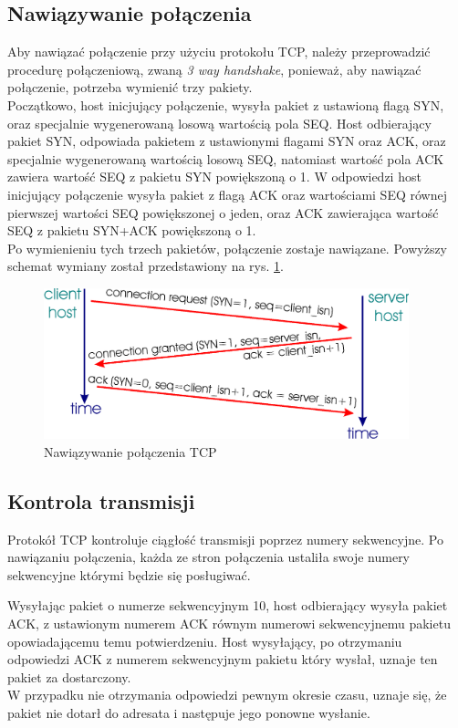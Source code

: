 \documentclass[a4paper,12pt,oneside]{book}
\begin{document}
		\subsection{Nawiązywanie połączenia}
			Aby nawiązać połączenie przy użyciu protokołu TCP, należy przeprowadzić procedurę połączeniową, zwaną \textit{3 way handshake}, ponieważ, aby nawiązać połączenie, potrzeba wymienić trzy pakiety.\\
			Początkowo, host inicjujący połączenie, wysyła pakiet z ustawioną flagą SYN, oraz specjalnie wygenerowaną losową wartością pola SEQ. Host odbierający pakiet SYN, odpowiada pakietem z ustawionymi flagami SYN oraz ACK, oraz specjalnie wygenerowaną wartością losową SEQ, natomiast wartość pola ACK zawiera wartość SEQ z pakietu SYN powiększoną o 1.
			W odpowiedzi host inicjujący połączenie wysyła pakiet z flagą ACK oraz wartościami SEQ równej pierwszej wartości SEQ powiększonej o jeden, oraz ACK zawierająca wartość SEQ z pakietu SYN+ACK powiększoną o 1.\\
			Po wymienieniu tych trzech pakietów, połączenie zostaje nawiązane.
			Powyższy schemat wymiany został przedstawiony na rys. \ref{fig:tcp_syn}.
			\begin{figure}[h]
				\centering
					\includegraphics[width=400px]{tcp_3way.png}
					\caption{Nawiązywanie połączenia TCP}
					\label{fig:tcp_syn}
			\end{figure}
		\subsection{Kontrola transmisji}
			Protokół TCP kontroluje ciągłość transmisji poprzez numery sekwencyjne.
			Po nawiązaniu połączenia, każda ze stron połączenia ustaliła swoje numery sekwencyjne którymi będzie się posługiwać.
			
			Wysyłając pakiet o numerze sekwencyjnym 10, host odbierający wysyła pakiet ACK, z ustawionym numerem ACK równym numerowi sekwencyjnemu pakietu opowiadającemu temu potwierdzeniu.
			Host wysyłający, po otrzymaniu odpowiedzi ACK z numerem sekwencyjnym pakietu który wysłał, uznaje ten pakiet za dostarczony.\\
			W przypadku nie otrzymania odpowiedzi pewnym okresie czasu, uznaje się, że pakiet nie dotarł do adresata i następuje jego ponowne wysłanie.
\end{document}
